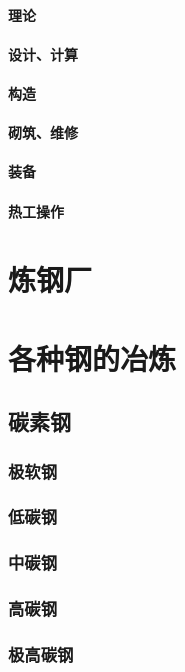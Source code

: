 \documentclass[UTF8]{../../ApplicationUniverse}
\begin{document}
            \paragraph{理论}
            \paragraph{设计、计算}
            \paragraph{构造}
            \paragraph{砌筑、维修}
            \paragraph{装备}
            \paragraph{热工操作}
\section{炼钢厂}
\section{各种钢的冶炼}
    \subsection{碳素钢}
        \subsubsection{极软钢}
        \subsubsection{低碳钢}
        \subsubsection{中碳钢}
        \subsubsection{高碳钢}
        \subsubsection{极高碳钢}
\end{document}

